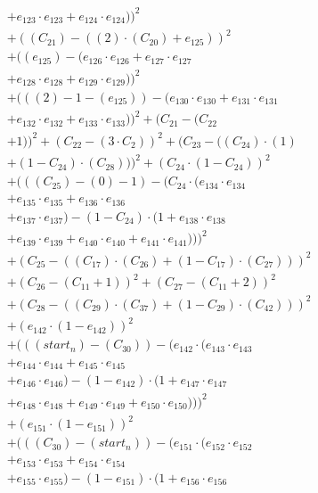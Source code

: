 \documentclass[10pt, a4paper]{article}
\begin{document}
\begin{align*}
& + e_{123} \cdot e_{123} + e_{124} \cdot e_{124}))^{2} \\
& + ((C_{21}) - ((2)  \cdot  (C_{20}) + e_{125}))^{2} \\
& + ((e_{125}) - (e_{126} \cdot e_{126} + e_{127} \cdot e_{127} \\
& + e_{128} \cdot e_{128} + e_{129} \cdot e_{129}))^{2} \\
& + (((2) - 1 - (e_{125})) - (e_{130} \cdot e_{130} + e_{131} \cdot e_{131} \\
& + e_{132} \cdot e_{132} + e_{133} \cdot e_{133}))^{2} + (C_{21} - (C_{22} \\
& + 1))^{2} + (C_{22} - (3  \cdot  C_{2}))^{2} + (C_{23} - ((C_{24})  \cdot  (1) \\
& + (1 - C_{24})  \cdot  (C_{28})))^{2} + (C_{24} \cdot (1 - C_{24}))^{2} \\
& + (((C_{25}) - (0) - 1) - (C_{24} \cdot (e_{134} \cdot e_{134} \\
& + e_{135} \cdot e_{135} + e_{136} \cdot e_{136} \\
& + e_{137} \cdot e_{137}) - (1 - C_{24}) \cdot (1 + e_{138} \cdot e_{138} \\
& + e_{139} \cdot e_{139} + e_{140} \cdot e_{140} + e_{141} \cdot e_{141})))^{2} \\
& + (C_{25} - ((C_{17})  \cdot  (C_{26}) + (1 - C_{17})  \cdot  (C_{27})))^{2} \\
& + (C_{26} - (C_{11} + 1))^{2} + (C_{27} - (C_{11} + 2))^{2} \\
& + (C_{28} - ((C_{29})  \cdot  (C_{37}) + (1 - C_{29})  \cdot  (C_{42})))^{2} \\
& + (e_{142} \cdot (1 - e_{142}))^{2} \\
& + (((start_n) - (C_{30})) - (e_{142} \cdot (e_{143} \cdot e_{143} \\
& + e_{144} \cdot e_{144} + e_{145} \cdot e_{145} \\
& + e_{146} \cdot e_{146}) - (1 - e_{142}) \cdot (1 + e_{147} \cdot e_{147} \\
& + e_{148} \cdot e_{148} + e_{149} \cdot e_{149} + e_{150} \cdot e_{150})))^{2} \\
& + (e_{151} \cdot (1 - e_{151}))^{2} \\
& + (((C_{30}) - (start_n)) - (e_{151} \cdot (e_{152} \cdot e_{152} \\
& + e_{153} \cdot e_{153} + e_{154} \cdot e_{154} \\
& + e_{155} \cdot e_{155}) - (1 - e_{151}) \cdot (1 + e_{156} \cdot e_{156} \\

\end{align*}
\end{document}
